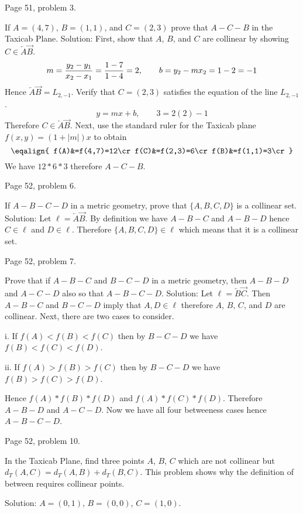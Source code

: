 
\beginsection Page 51, problem 3.

If $A=(4,7)$, $B=(1,1)$, and $C=(2,3)$ prove that $A{-}C{-}B$ in the Taxicab Plane.
\medskip\noindent
Solution:
First, show that $A$, $B$, and $C$ are collinear by showing
$C\in\overleftarrow A\overrightarrow B$.
$$m={y_2-y_1\over x_2-x_1}={1-7\over1-4}=2,\qquad b=y_2-mx_2=1-2=-1$$
Hence
$\overleftarrow A\overrightarrow B=L_{2,-1}$.
Verify that $C=(2,3)$ satisfies the equation of the line $L_{2,-1}$.
$$y=mx+b,\qquad 3=2(2)-1$$
Therefore $C\in\overleftarrow A\overrightarrow B$.
Next, use the standard ruler for the Taxicab plane $f(x,y)=(1+|m|)x$ to obtain
$$\eqalign{
f(A)&=f(4,7)=12\cr
f(C)&=f(2,3)=6\cr
f(B)&=f(1,1)=3\cr
}$$
We have $12*6*3$ therefore $A{-}C{-}B$.

\beginsection Page 52, problem 6.

If $A{-}B{-}C{-}D$ in a metric geometry, prove that
$\{A,B,C,D\}$ is a collinear set.
\medskip\noindent
Solution: Let $\ell=\overleftarrow A\overrightarrow B$.
By definition we have $A{-}B{-}C$ and $A{-}B{-}D$
hence $C\in\ell$ and $D\in\ell$.
Therefore $\{A,B,C,D\}\in\ell$ which means that it is a collinear set.

\beginsection Page 52, problem 7.

Prove that if $A{-}B{-}C$ and $B{-}C{-}D$ in a metric geometry,
then $A{-}B{-}D$ and $A{-}C{-}D$ also so that $A{-}B{-}C{-}D$.
\medskip\noindent
Solution: Let $\ell=\overleftarrow B\overrightarrow C$.
Then $A{-}B{-}C$ and $B{-}C{-}D$ imply that $A,D\in\ell$
therefore $A$, $B$, $C$, and $D$ are collinear.
Next, there are two cases to consider.
\item{i.} If $f(A)<f(B)<f(C)$ then by $B{-}C{-}D$ we have $f(B)<f(C)<f(D)$.
\item{ii.} If $f(A)>f(B)>f(C)$ then by $B{-}C{-}D$ we have $f(B)>f(C)>f(D)$.

\noindent
Hence $f(A)*f(B)*f(D)$ and $f(A)*f(C)*f(D)$.
Therefore $A{-}B{-}D$ and $A{-}C{-}D$.
Now we have all four betweeness cases hence $A{-}B{-}C{-}D$.

\beginsection Page 52, problem 10.

In the Taxicab Plane, find three points $A$, $B$, $C$ which are not collinear
but $d_T(A,C)=d_T(A,B)+d_T(B,C)$. This problem shows why the definition of
between requires collinear points.

\medskip\noindent
Solution: $A=(0,1)$, $B=(0,0)$, $C=(1,0)$.

